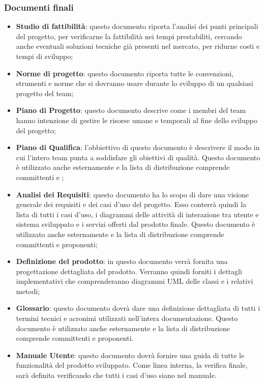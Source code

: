 \documentclass[../NormeDiProgetto.tex]{subfiles}
\begin{document}
\subsubsection{Documenti finali}
\begin{itemize}
\item \textbf{Studio di fattibilità}: questo documento riporta l'analisi dei punti principali del progetto, per verificarne la fattibilità nei tempi prestabiliti, cercando anche eventuali soluzioni tecniche già presenti nel mercato, per ridurne costi e tempi di sviluppo;
\item \textbf{Norme di progetto}: questo documento riporta tutte le convenzioni, strumenti e norme che si dovranno usare durante lo sviluppo di un qualsiasi progetto del team;
\item \textbf{Piano di Progetto}: questo documento descrive come i membri del team hanno intenzione di gestire le risorse umane e temporali al fine dello sviluppo del progetto;
\item \textbf{Piano di Qualifica}: l'obbiettivo di questo documento è descrivere il modo in cui l'intero team punta a soddisfare gli obiettivi di qualità. Questo documento è utilizzato anche esternamente e la lista di distribuzione
comprende committenti e ;
\item \textbf{Analisi dei Requisiti}: questo documento ha lo scopo di dare una visione generale dei requisiti e dei casi d'uso del progetto.
Esso conterrà quindi la lista di tutti i casi d'uso, i diagrammi delle attività di interazione tra utente e sistema sviluppato e i servizi offerti dal prodotto finale. Questo documento è utilizzato anche esternamente e la lista di distribuzione comprende committenti e proponenti;
\item \textbf{Definizione del prodotto}: in questo documento verrà fornita una progettazione dettagliata del prodotto. Verranno quindi forniti i dettagli implementativi che comprenderanno diagrammi UML delle classi e i relativi metodi;
\item \textbf{Glossario}: questo documento dovrà dare una definizione dettagliata di tutti i termini tecnici e acronimi utilizzati nell'intera documentazione. Questo documento è utilizzato anche esternamente e la lista di distribuzione comprende committenti e proponenti.
\item \textbf{Manuale Utente}: questo documento dovrà fornire una guida di tutte le funzionalità del prodotto sviluppato.
Come linea interna, la verifica finale, sarà definita verificando che tutti i casi d'uso siano nel manuale.

\end{itemize}
\end{document}
